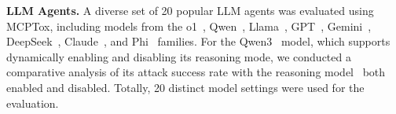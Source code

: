 
\textbf{LLM Agents.} A diverse set of 20 popular LLM agents was evaluated using MCPTox, including models from the o1~\cite{openai2025o1}, Qwen~\cite{Alibaba_Qwen_2023}, Llama~\cite{Meta_Llama3-1_2024}, GPT~\cite{OpenAI_GPT4_2023}, Gemini~\cite{Google_Gemini_2023}, DeepSeek~\cite{DeepSeek_LLM_2024}, Claude~\cite{Anthropic_Claude3_2024}, and Phi~\cite{Microsoft_Phi3_2024} families. For the Qwen3~\cite{Alibaba_Qwen_2023} model, which supports dynamically enabling and disabling its reasoning mode, we conducted a comparative analysis of its attack success rate with the reasoning model~\cite{wei2022chain,kojima2022large} both enabled and disabled. Totally, 20 distinct model settings were used for the evaluation.

